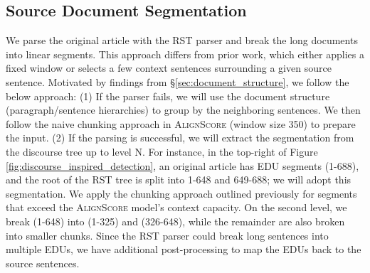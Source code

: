 \subsection{Source Document Segmentation}\label{sec:source_segment}

We parse the original article with the RST parser and break the long documents into linear segments. This approach differs from prior work, which either applies a fixed window or selects a few context sentences surrounding a given source sentence. Motivated by findings from \S \ref{sec:document_structure}, we follow the below approach:
(1) If the parser fails, we will use the document structure (paragraph/sentence hierarchies) to group by the neighboring sentences. We then follow the naive chunking approach in \textsc{AlignScore} (window size 350) to prepare the input. 
(2) If the parsing is successful, we will extract the segmentation from the discourse tree up to level N. For instance, in the top-right of Figure \ref{fig:discourse_inspired_detection}, an original article has EDU segments (1-688), and the root of the RST tree is split into 1-648 and 649-688; we will adopt this segmentation. We apply the chunking approach outlined previously for segments that exceed the \textsc{AlignScore} model's context capacity. On the second level, we break (1-648) into (1-325) and (326-648), while the remainder are also broken into smaller chunks. Since the RST parser could break long sentences into multiple EDUs, we have additional post-processing to map the EDUs back to the source sentences.

